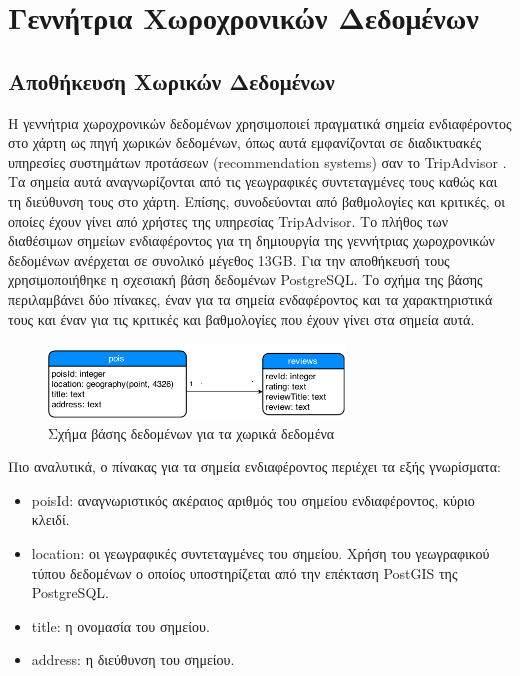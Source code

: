 \chapter{Γεννήτρια Χωροχρονικών Δεδομένων}

\section{Αποθήκευση Χωρικών Δεδομένων}

Η γεννήτρια χωροχρονικών δεδομένων χρησιμοποιεί πραγματικά σημεία ενδιαφέροντος στο χάρτη ως πηγή χωρικών δεδομένων, όπως αυτά εμφανίζονται σε διαδικτυακές υπηρεσίες 
συστημάτων προτάσεων (recommendation systems) σαν το TripAdvisor \cite{1}. Τα σημεία αυτά αναγνωρίζονται από τις γεωγραφικές συντεταγμένες τους καθώς και τη 
διεύθυνση τους στο χάρτη. Επίσης, συνοδεύονται από βαθμολογίες και κριτικές, οι οποίες έχουν γίνει από χρήστες της υπηρεσίας TripAdvisor. Το πλήθος των  
διαθέσιμων σημείων ενδιαφέροντος για τη δημιουργία της γεννήτριας χωροχρονικών δεδομένων ανέρχεται σε συνολικό μέγεθος 13GB. Για την αποθήκευσή τους χρησιμοποιήθηκε 
η σχεσιακή βάση δεδομένων PostgreSQL. Το σχήμα της βάσης περιλαμβάνει δύο πίνακες, έναν για τα σημεία ενδαφέροντος και τα χαρακτηριστικά τους και έναν για τις κριτικές και 
βαθμολογίες που έχουν γίνει στα σημεία αυτά. 

\begin{figure}[H]
  \centering
  \includegraphics[width=0.7\textwidth]{figures/schema.png}
  \caption{Σχήμα βάσης δεδομένων για τα χωρικά δεδομένα}
\end{figure}

Πιο αναλυτικά, ο πίνακας για τα σημεία ενδιαφέροντος περιέχει τα εξής γνωρίσματα:

\begin{itemize}
 \item poisId: αναγνωριστικός ακέραιος αριθμός του σημείου ενδιαφέροντος, κύριο κλειδί.
 \item location: οι γεωγραφικές συντεταγμένες του σημείου. Χρήση του γεωγραφικού τύπου δεδομένων ο οποίος υποστηρίζεται από την επέκταση PostGIS της PostgreSQL.
 \item title: η ονομασία του σημείου.
 \item address: η διεύθυνση του σημείου.
\end{itemize}

